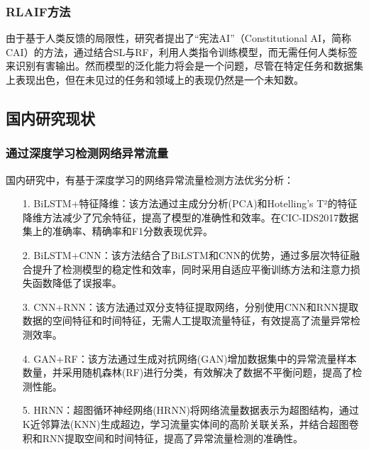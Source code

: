 \subsubsection{RLAIF方法}
由于基于人类反馈的局限性，研究者提出了“宪法AI”\cite{Bai2022ConstitutionalAH}（Constitutional AI，简称CAI）的方法，通过结合SL与RF，利用人类指令训练模型，而无需任何人类标签来识别有害输出。然而模型的泛化能力将会是一个问题，尽管在特定任务和数据集上表现出色，但在未见过的任务和领域上的表现仍然是一个未知数。
\subsubsection{}
\subsection{国内研究现状}
\subsubsection{通过深度学习检测网络异常流量}
国内研究中，有基于深度学习的网络异常流量检测方法优劣分析\cite{yang2024network}：
\begin{itemize}
    \item[1.] BiLSTM+特征降维：该方法通过主成分分析(PCA)和Hotelling's T²的特征降维方法减少了冗余特征，提高了模型的准确性和效率。在CIC-IDS2017数据集上的准确率、精确率和F1分数表现优异。
    \item[2.] BiLSTM+CNN：该方法结合了BiLSTM和CNN的优势，通过多层次特征融合提升了检测模型的稳定性和效率，同时采用自适应平衡训练方法和注意力损失函数降低了误报率。
    \item[3.] CNN+RNN：该方法通过双分支特征提取网络，分别使用CNN和RNN提取数据的空间特征和时间特征，无需人工提取流量特征，有效提高了流量异常检测效率。
    \item[4.] GAN+RF：该方法通过生成对抗网络(GAN)增加数据集中的异常流量样本数量，并采用随机森林(RF)进行分类，有效解决了数据不平衡问题，提高了检测性能。
    \item[5.] HRNN：超图循环神经网络(HRNN)将网络流量数据表示为超图结构，通过K近邻算法(KNN)生成超边，学习流量实体间的高阶关联关系，并结合超图卷积和RNN提取空间和时间特征，提高了异常流量检测的准确性。
\end{itemize}

